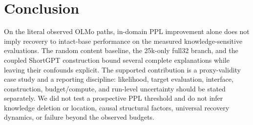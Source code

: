 \section{Conclusion}
\label{sec:conclusion}

On the literal observed OLMo paths, in-domain PPL improvement alone does not
imply recovery to intact-base performance on the measured knowledge-sensitive
evaluations. The random content baseline, the 25k-only full32 branch, and the
coupled ShortGPT construction bound several complete explanations while leaving
their confounds explicit. The supported contribution is a proxy-validity case
study and a reporting discipline: likelihood, target evaluation, interface,
construction, budget/compute, and run-level uncertainty should be stated
separately. We did not test a prospective PPL threshold and do not infer
knowledge deletion or location, causal structural factors, universal recovery
dynamics, or failure beyond the observed budgets.
